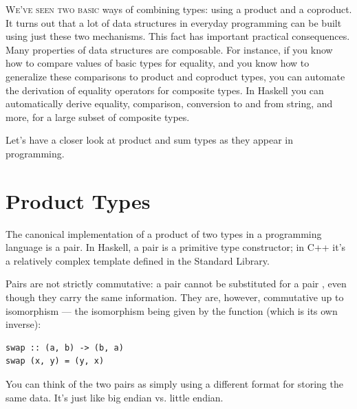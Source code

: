 \lettrine[lhang=0.17]{W}{e've seen two basic} ways of combining types: using a product and a
coproduct. It turns out that a lot of data structures in everyday
programming can be built using just these two mechanisms. This fact has
important practical consequences. Many properties of data structures are
composable. For instance, if you know how to compare values of basic
types for equality, and you know how to generalize these comparisons to
product and coproduct types, you can automate the derivation of equality
operators for composite types. In Haskell you can automatically derive
equality, comparison, conversion to and from string, and more, for a
large subset of composite types.

Let's have a closer look at product and sum types as they appear in
programming.

\section{Product Types}\label{product-types}

The canonical implementation of a product of two types in a programming
language is a pair. In Haskell, a pair is a primitive type constructor;
in C++ it's a relatively complex template defined in the Standard
Library.

\begin{figure}
  \centering
\end{figure}

\noindent
Pairs are not strictly commutative: a pair  cannot
be substituted for a pair , even though they carry
the same information. They are, however, commutative up to isomorphism
--- the isomorphism being given by the  function (which is
its own inverse):

\begin{verbatim}
swap :: (a, b) -> (b, a)
swap (x, y) = (y, x)
\end{verbatim}

\noindent
You can think of the two pairs as simply using a different format for
storing the same data. It's just like big endian vs. little endian.


